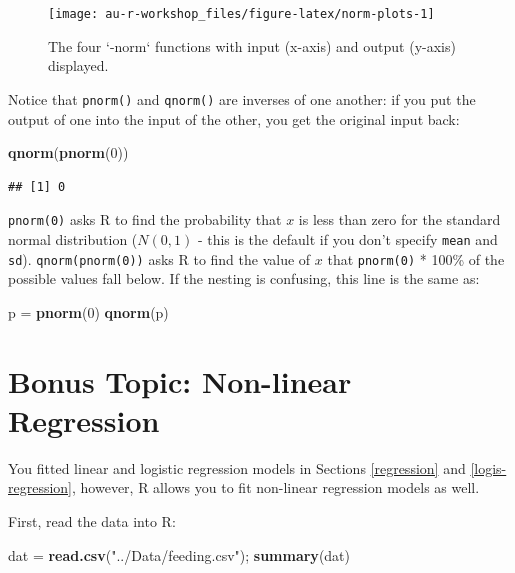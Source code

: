 \documentclass[]{book}
\newenvironment{Shaded}{\begin{snugshade}}{\end{snugshade}}
\newcommand{\KeywordTok}[1]{\textcolor[rgb]{0.13,0.29,0.53}{\textbf{#1}}}
\newcommand{\DecValTok}[1]{\textcolor[rgb]{0.00,0.00,0.81}{#1}}
\newcommand{\StringTok}[1]{\textcolor[rgb]{0.31,0.60,0.02}{#1}}
\newcommand{\NormalTok}[1]{#1}
\theoremstyle{definition}
\theoremstyle{definition}
\theoremstyle{definition}
\theoremstyle{remark}
\begin{document}
\begin{figure}

{\centering \texttt{[image: au-r-workshop\_files/figure-latex/norm-plots-1]} 

}

\caption{The four `-norm` functions with input (x-axis) and output (y-axis) displayed.}\label{fig:norm-plots}
\end{figure}

Notice that \texttt{pnorm()} and \texttt{qnorm()} are inverses of one
another: if you put the output of one into the input of the other, you
get the original input back:

\begin{Shaded}
\begin{Highlighting}[]
\KeywordTok{qnorm}\NormalTok{(}\KeywordTok{pnorm}\NormalTok{(}\DecValTok{0}\NormalTok{))}
\end{Highlighting}
\end{Shaded}

\begin{verbatim}
## [1] 0
\end{verbatim}

\texttt{pnorm(0)} asks R to find the probability that \(x\) is less than
zero for the standard normal distribution (\(N(0,1)\) - this is the
default if you don't specify \texttt{mean} and \texttt{sd}).
\texttt{qnorm(pnorm(0))} asks R to find the value of \(x\) that
\texttt{pnorm(0)} * 100\% of the possible values fall below. If the
nesting is confusing, this line is the same as:

\begin{Shaded}
\begin{Highlighting}[]
\NormalTok{p =}\StringTok{ }\KeywordTok{pnorm}\NormalTok{(}\DecValTok{0}\NormalTok{)}
\KeywordTok{qnorm}\NormalTok{(p)}
\end{Highlighting}
\end{Shaded}

\section{Bonus Topic: Non-linear Regression}\label{nls}

You fitted linear and logistic regression models in Sections
\ref{regression} and \ref{logis-regression}, however, R allows you to
fit non-linear regression models as well.

First, read the data into R:

\begin{Shaded}
\begin{Highlighting}[]
\NormalTok{dat =}\StringTok{ }\KeywordTok{read.csv}\NormalTok{(}\StringTok{"../Data/feeding.csv"}\NormalTok{); }\KeywordTok{summary}\NormalTok{(dat)}
\end{Highlighting}
\end{Shaded}
\end{document}
